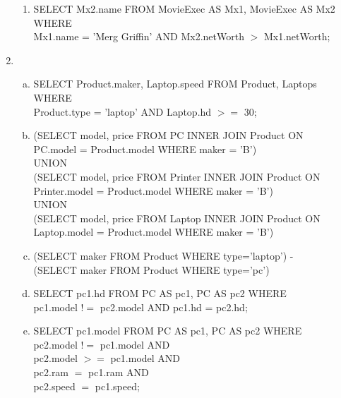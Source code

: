 \documentclass[12pt]{article}
\begin{document}
\begin{enumerate}[1.]
\begin{enumerate}
        \item SELECT Mx2.name FROM MovieExec AS Mx1, MovieExec AS Mx2 WHERE\\
        Mx1.name = 'Merg Griffin' AND Mx2.netWorth $>$ Mx1.netWorth;
    \end{enumerate}

    \item

    \begin{enumerate}[a)]
        \item SELECT Product.maker, Laptop.speed FROM Product, Laptops WHERE\\
        Product.type = 'laptop' AND Laptop.hd $>=$ 30;
        \item (SELECT model, price FROM PC INNER JOIN Product ON \\
        PC.model = Product.model WHERE maker = 'B') \\

        UNION \\

        (SELECT model, price FROM Printer INNER JOIN Product ON \\
            Printer.model = Product.model WHERE maker = 'B') \\

        UNION \\

        (SELECT model, price FROM Laptop INNER JOIN Product ON \\
            Laptop.model = Product.model WHERE maker = 'B') \\

        \item

        (SELECT maker FROM Product WHERE type='laptop') - \\
        (SELECT maker FROM Product WHERE type='pc')

        \item

        SELECT pc1.hd FROM PC AS pc1, PC AS pc2 WHERE \\
        pc1.model $!=$ pc2.model AND pc1.hd = pc2.hd;

        \item

        SELECT pc1.model FROM PC AS pc1, PC AS pc2 WHERE \\
        pc2.model $!=$ pc1.model AND \\
        pc2.model $>=$ pc1.model AND \\
        pc2.ram $=$ pc1.ram AND \\
        pc2.speed $=$ pc1.speed;


\end{enumerate}
\end{enumerate}
\end{document}
